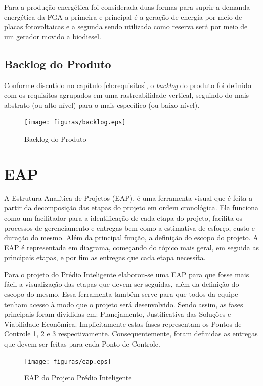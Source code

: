 Para a produção energética foi considerada duas formas para suprir a demanda energética da FGA a primeira e principal é a geração de energia por meio de placas fotovoltaicas e a segunda sendo utilizada como reserva será por meio de um gerador movido a biodiesel.

\section{Backlog do Produto}
Conforme discutido no capítulo \ref{ch:requisitos}, o \textit{backlog} do produto foi definido com os requisitos agrupados em uma rastreabilidade vertical, seguindo do mais abstrato (ou alto nível) para o mais específico (ou baixo nível).

\begin{figure}[!h]
  \centering
  	\texttt{[image: figuras/backlog.eps]}
   \caption{Backlog do Produto\label{fig:backlog}}

\end{figure}

\chapter{EAP}
	A Estrutura Analítica de Projetos (EAP), é uma ferramenta visual que é feita a partir da decomposição das etapas do projeto em ordem cronológica. Ela funciona como um facilitador para a identificação de cada etapa do projeto, facilita os processos de gerenciamento e entregas bem como a estimativa de esforço, custo e duração do mesmo. Além da principal função, a definição do escopo do projeto. A EAP é representada em diagrama, começando do tópico mais geral, em seguida as principais etapas, e por fim as entregas que cada etapa necessita.

Para o projeto do Prédio Inteligente elaborou-se uma EAP para que fosse mais fácil a visualização das etapas que devem ser seguidas, além da definição do escopo do mesmo. Essa ferramenta também serve para que todos da equipe tenham acesso à modo que o projeto será desenvolvido. Sendo assim, as fases principais foram divididas em: Planejamento, Justificativa das Soluções e Viabilidade Econômica. Implicitamente estas fases representam os Pontos de Controle 1, 2 e 3 respectivamente. Consequentemente, foram definidas as entregas que devem ser feitas para cada Ponto de Controle.
 \begin{figure}[!h]
 	\centering
 	\texttt{[image: figuras/eap.eps]}
 	\caption{EAP do Projeto Prédio Inteligente}
 	\label{fig01}
 \end{figure}
